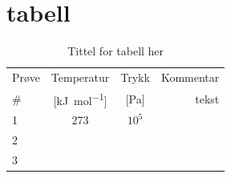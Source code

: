 \section{tabell}
\begin{table}[htb!]
    \centering
    \begin{tabular}{l c c | r}
    \toprule
        Prøve & Temperatur & Trykk & Kommentar  \\
        \# & [\si{\kilo\joule\per\mole}] & [\si{\pascal}] & tekst\\
        1 & 273 & $10^5$ & \\
    \midrule
        2 & & & \\ 
        3 & & & \\
    \bottomrule
    \end{tabular}
    \caption{Tittel for tabell her}
    \label{tab:my_label}
\end{table}